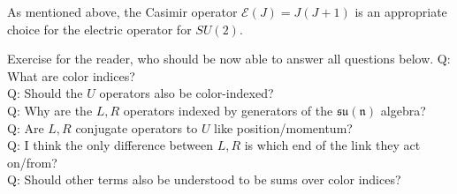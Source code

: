 \documentclass[11pt,reqno]{amsart}
\numberwithin{equation}{section}
\begin{document}
	As mentioned above, the Casimir operator $\mathcal{E}(J)=J(J+1)$ is an appropriate choice for the electric operator for $SU(2)$.


	Exercise for the reader, who should be now able to answer all questions below.
	\noindent Q: What are color indices?\\
	Q: Should the $U$ operators also be color-indexed?\\
	Q: Why are the $L,R$ operators indexed by generators of the $\mathfrak{su(n)}$ algebra?\\
	Q: Are $L,R$ conjugate operators to $U$ like position/momentum?\\
	Q: I think the only difference between $L,R$ is which end of the link they act on/from?\\
	Q: Should other terms also be understood to be sums over color indices?

	
	
	
	\nocite{Hamer82}
	\nocite{AKHvD11}
	\nocite{Zohar_2015}
\end{document}
